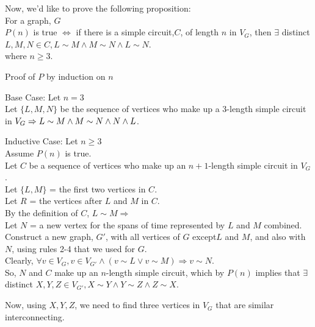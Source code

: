 \documentclass[fleqn]{article}
\begin{document}
Now, we'd like to prove the following proposition:\\
For a graph, $G$\\
$P(n)$ is true $\Leftrightarrow$ if there is a simple circuit,$C$, of length $n$ in $V_G$, then $\exists$ distinct $ L,M,N \in C,
                        L \sim M \wedge M \sim N \wedge L \sim N$.\\
where $n \geq 3$.

Proof of $P$ by induction on $n$

Base Case: Let $n = 3$\\
Let $\lbrace L, M, N \rbrace$ be the sequence of vertices who make up a 3-length simple circuit in $V_G \Rightarrow\\
L \sim M \wedge M \sim N \wedge N \wedge L$.

Inductive Case: Let $n \geq 3$\\
Assume $P(n)$ is true.\\
Let $C$ be a sequence of vertices who make up an $n+1$-length simple circuit in $V_G$.\\
Let $\lbrace L,M \rbrace$ = the first two vertices in $C$.\\
Let $R$ = the vertices after $L$ and $M$ in $C$.\\
By the definition of $C$, $L \sim M \Rightarrow$\\
Let $N$ = a new vertex for the spans of time represented by $L$ and $M$ combined.\\
Construct a new graph, $G'$, with all vertices of $G$ except$L$ and $M$, and also with $N$, using rules 2-4 that we used for $G$.\\
Clearly, $\forall v \in V_G, v \in V_{G'} \wedge (v \sim L \vee v \sim M)
          \Rightarrow v \sim N$.\\
So, $N$ and $C$ make up an $n$-length simple circuit, which by $P(n)$ implies that $\exists$ distinct $X,Y,Z \in V_{G'},
              X \sim Y \wedge Y \sim Z \wedge Z \sim X$.

Now, using $X,Y,Z$, we need to find three vertices in $V_G$ that are similar interconnecting.
\end{document}
